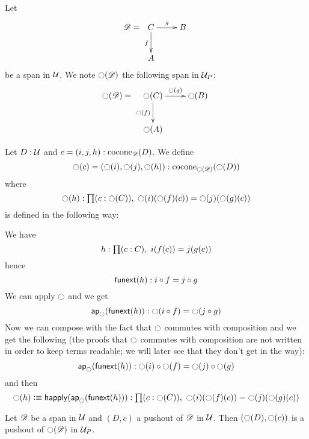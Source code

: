 \begin{defn}
  Let
  \[\Ddiag=\xymatrix{C \ar^g[r] \ar_f[d] & B \\ A & }\]
  be a span in $\type$. We note $\reflect(\Ddiag)$ the following
  span in $\P$:
  \[\reflect(\Ddiag)=\xymatrix{\reflect(C) \ar^{\reflect(g)}[r]
    \ar_{\reflect(f)}[d] & \reflect(B) \\ \reflect(A) & }\]
\end{defn}

\begin{defn}
  Let $D:\type$ and $c=(i,j,h):\cocone{\Ddiag}{D}$.
  We define
  \[\reflect(c)=(\reflect(i),\reflect(j),\reflect(h)):
  \cocone{\reflect(\Ddiag)}{\reflect(D)}\]
  where
  \[\reflect(h):\prd{c:\reflect(C)}\reflect(i)(\reflect(f)(c))=\reflect(j)(\reflect(g)(c))\]
  is defined in the following way:

  We have \[h:\prd{c:C}i(f(c))=j(g(c))\]
  hence
  \[\funext(h):i\circ{}f=j\circ{}g\]
  We can apply $\reflect$ and we get
  \[\mapfunc{\reflect}(\funext(h)):\reflect(i\circ{}f)=\reflect(j\circ{}g)\]
  Now we can compose with the fact that $\reflect$ commutes with composition and
  we get the following (the proofs that $\reflect$ commutes with composition are
  not written in order to keep terms readable; we will later see that they don't
  get in the way):
  \[\mapfunc{\reflect}(\funext(h)):
  \reflect(i)\circ\reflect(f)=\reflect(j)\circ\reflect(g)\]
  and then
  \[\reflect(h)\defeq\happly(\mapfunc{\reflect}(\funext(h))):
  \prd{c:\reflect(C)}\reflect(i)(\reflect(f)(c))=\reflect(j)(\reflect(g)(c))\]
\end{defn}

\begin{lem}
  \label{reflectcommutespushout}
  Let $\Ddiag$ be a span in $\type$ and $(D,c)$ a pushout of $\Ddiag$
  in $\type$. Then $(\reflect(D),\reflect(c))$ is a pushout of
  $\reflect(\Ddiag)$ in $\P$.
\end{lem}

